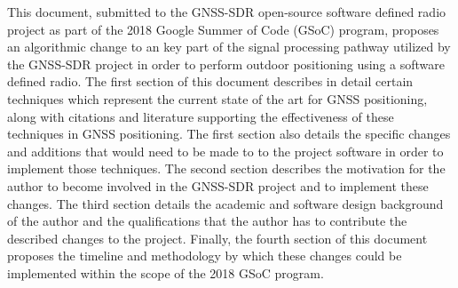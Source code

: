 This document, submitted to the GNSS-SDR open-source software defined radio project as part of the 2018 Google Summer of Code (GSoC) program, proposes an algorithmic change to an key part of the signal processing pathway utilized by the GNSS-SDR project in order to perform outdoor positioning using a software defined radio. The first section of this document describes in detail certain techniques which represent the current state of the art for GNSS positioning, along with citations and literature supporting the effectiveness of these techniques in GNSS positioning. The first section also details the specific changes and additions that would need to be made to to the project software in order to implement those techniques. The second section describes the motivation for the author to become involved in the GNSS-SDR project and to implement these changes. The third section details the academic and software design background of the author and the qualifications that the author has to contribute the described changes to the project. Finally, the fourth section of this document proposes the timeline and methodology by which these changes could be implemented within the scope of the 2018 GSoC program.

